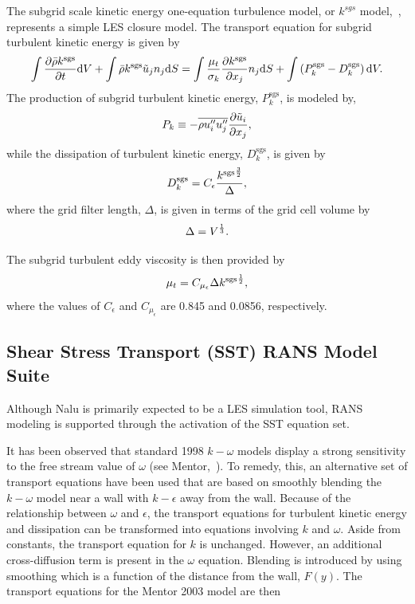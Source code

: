 The subgrid scale kinetic energy one-equation turbulence model, or 
$k^{sgs}$ model,~\cite{Davidson:1997}, represents a simple LES closure model.  The transport 
equation for subgrid turbulent kinetic energy is given by
%
\begin{equation}
  \int {{\partial \bar{\rho}{k^\mathrm{sgs}}} \over {\partial t}} {\rm d}V
  + \int \bar{\rho}{k^\mathrm{sgs}} \tilde{u}_j n_j {\rm d}S = 
    \int {{\mu_t} \over {\sigma_k}} 
          {{\partial {k^\mathrm{sgs}}} \over
           {\partial x_j}} n_j {\rm d}S + 
   \int \left(P_k^\mathrm{sgs} - D_k^\mathrm{sgs}\right) {\rm d}V.
\label{ksgs}
\end{equation}
%
The production of subgrid turbulent kinetic energy, $P_k^\mathrm{sgs}$, is 
modeled by,
\begin{equation}
   P_k \equiv  -\overline{\rho u_i'' u_j''}
      {{\partial \tilde{u}_i} \over {\partial x_j}},
\label{mod-prod}     
\end{equation}
while the dissipation of turbulent kinetic energy, $D_k^\mathrm{sgs}$, is given by
%
\begin{equation}
D_k^\mathrm{sgs} = C_{\epsilon} { { {k^\mathrm{sgs}}^{{3}\over {2}} } 
     \over { \Delta} },
\end{equation}
%
where the grid filter length, $\Delta$, is given in terms of the grid cell
volume by
%
\begin{equation}
\Delta = V^{{1}\over{3}}.
\end{equation}

The subgrid turbulent eddy viscosity is then provided by 
%
\begin{equation}
\mu_t = C_{\mu_{\epsilon}} \Delta {k^\mathrm{sgs}}^{{1} \over {2}},
\end{equation}
%
where the values of $C_{\epsilon}$ and $C_{\mu_{\epsilon}}$ are 
0.845 and 0.0856, respectively.

\subsection{Shear Stress Transport (SST) RANS Model Suite} \label{sec:sst}
Although Nalu is primarily expected to be a LES simulation tool, RANS modeling is supported
through the activation of the SST equation set.

It has been observed that standard 1998 $k-\omega$ models display a strong sensitivity 
to the free stream value of $\omega$ (see Mentor,~\cite{Mentor:2003}).  To remedy, this, an 
alternative set of transport equations have been used that are based on smoothly 
blending the $k-\omega$ model near a wall with $k-\epsilon$ away from the wall.  
Because of the relationship between $\omega$ and $\epsilon$, the transport equations 
for turbulent kinetic energy and dissipation can be transformed into equations 
involving $k$ and $\omega$.  Aside from constants, the transport equation for 
$k$ is unchanged.  However, an additional cross-diffusion term is present in 
the $\omega$ equation.  Blending is introduced by using smoothing which is a 
function of the distance from the wall, $F(y)$.  The transport equations for the Mentor 2003 model
 are then

